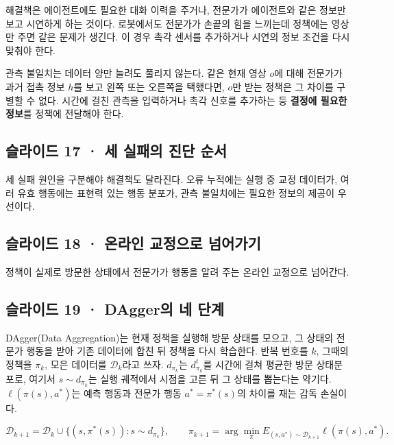 \documentclass[11pt,a4paper]{article}
\begin{document}
해결책은 에이전트에도 필요한 대화 이력을 주거나, 전문가가 에이전트와 같은 정보만 보고 시연하게 하는 것이다. 로봇에서도 전문가가 손끝의 힘을 느끼는데 정책에는 영상만 주면 같은 문제가 생긴다. 이 경우 촉각 센서를 추가하거나 시연의 정보 조건을 다시 맞춰야 한다.\par

관측 불일치는 데이터 양만 늘려도 풀리지 않는다. 같은 현재 영상 $o$에 대해 전문가가 과거 접촉 정보 $h$를 보고 왼쪽 또는 오른쪽을 택했다면, $o$만 받는 정책은 그 차이를 구별할 수 없다. 시간에 걸친 관측을 입력하거나 촉각 신호를 추가하는 등 \textbf{결정에 필요한 정보}를 정책에 전달해야 한다.\par

\subsection{슬라이드 17 · 세 실패의 진단 순서}

세 실패 원인을 구분해야 해결책도 달라진다. 오류 누적에는 실행 중 교정 데이터가, 여러 유효 행동에는 표현력 있는 행동 분포가, 관측 불일치에는 필요한 정보의 제공이 우선이다.\par

\subsection{슬라이드 18 · 온라인 교정으로 넘어가기}

정책이 실제로 방문한 상태에서 전문가가 행동을 알려 주는 온라인 교정으로 넘어간다.\par

\subsection{슬라이드 19 · DAgger의 네 단계}

DAgger(Data Aggregation)는 현재 정책을 실행해 방문 상태를 모으고, 그 상태의 전문가 행동을 받아 기존 데이터에 합친 뒤 정책을 다시 학습한다. 반복 번호를 $k$, 그때의 정책을 $\pi_k$, 모은 데이터를 $\mathcal D_k$라고 쓰자. $d_{\pi_k}$는 $d_{\pi_k}^t$를 시간에 걸쳐 평균한 방문 상태분포로, 여기서 $s\sim d_{\pi_k}$는 실행 궤적에서 시점을 고른 뒤 그 상태를 뽑는다는 약기다. $\ell(\pi(s),a^*)$는 예측 행동과 전문가 행동 $a^*=\pi^*(s)$의 차이를 재는 감독 손실이다.\par

\[
\mathcal D_{k+1}
=\mathcal D_k\cup\{(s,\pi^*(s)):s\sim d_{\pi_k}\},
\qquad
\pi_{k+1}=\arg\min_\pi E_{(s,a^*)\sim\mathcal D_{k+1}}\ell(\pi(s),a^*).
\]
\end{document}
